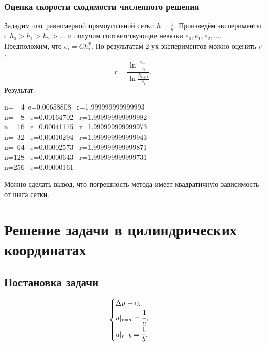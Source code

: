 \documentclass{report}
\begin{document}
\subsection{Оценка скорости сходимости численного решения}
Зададим шаг равномерной прямоугольной сетки $h=\frac{1}{n}$. Произведём эксперименты с $h_0>h_1>h_2>...$ и получим соответствующие невязки $e_0, e_1, e_2, ...$. Предположим, что $e_i=Ch_i^r$. По результатам 2-ух экспериментов можно оценить $r$:
\begin{equation}
	r = \frac{\ln{\frac{e_{i+1}}{e_i}}}{\ln{\frac{h_{i+1}}{h_i}}}.
\end{equation}
Результат:\\
\begin{center}
n=~~4~e=0.00658808 ~r=1.999999999999993\\
n=~~8~ e=0.00164702~ r=1.999999999999982\\
n=~16 ~e=0.00041175~ r=1.999999999999973\\
n=~32 ~e=0.00010294~ r=1.999999999999943\\
n=~64 ~e=0.00002573~ r=1.999999999999871\\
n=128 ~e=0.00000643~ r=1.999999999999731\\
n=256 ~e=0.00000161
\end{center}
Можно сделать вывод, что погрешность метода имеет квадратичную зависимость от шага сетки.

\chapter{Решение задачи в цилиндрических координатах}
\section{Постановка задачи}
\begin{equation}
	\begin{cases}
		\Delta u = 0,\\
		u|_{r=a}=\cfrac{1}{a},\\
		u|_{r=b}=\cfrac{1}{b}.
	\end{cases}
\end{equation}
\end{document}
